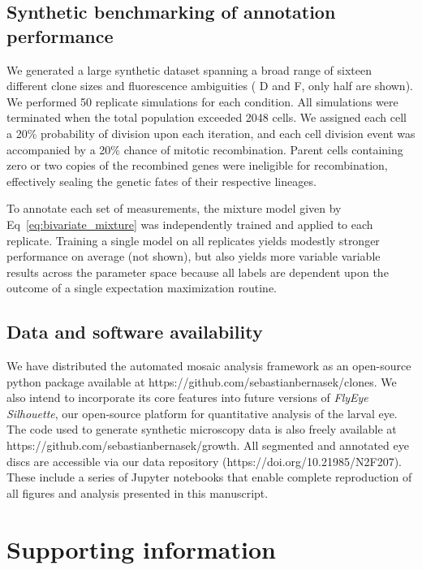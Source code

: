 \documentclass[10pt,letterpaper]{article}
\begin{document}
\subsection*{Synthetic benchmarking of annotation performance}

We generated a large synthetic dataset spanning a broad range of sixteen different clone sizes and fluorescence ambiguities ( D and  F, only half are shown). We performed 50 replicate simulations for each condition. All simulations were terminated when the total population exceeded 2048 cells. We assigned each cell a 20\% probability of division upon each iteration, and each cell division event was accompanied by a 20\% chance of mitotic recombination. Parent cells containing zero or two copies of the recombined genes were ineligible for recombination, effectively sealing the genetic fates of their respective lineages. 

To annotate each set of measurements, the mixture model given by Eq~\ref{eq:bivariate_mixture} was independently trained and applied to each replicate. Training a single model on all replicates yields modestly stronger performance on average (not shown), but also yields more variable variable results across the parameter space because all labels are dependent upon the outcome of a single expectation maximization routine. 


\subsection*{Data and software availability}

We have distributed the automated mosaic analysis framework as an open-source python package available at https://github.com/sebastianbernasek/clones. We also intend to incorporate its core features into future versions of \textit{FlyEye Silhouette}, our open-source platform for quantitative analysis of the larval eye. The code used to generate synthetic microscopy data is also freely available at https://github.com/sebastianbernasek/growth. All segmented and annotated eye discs are accessible via our data repository (https://doi.org/10.21985/N2F207). These include a series of Jupyter notebooks that enable complete reproduction of all figures and analysis presented in this manuscript.

\singlespacing


\section*{Supporting information}
\end{document}
